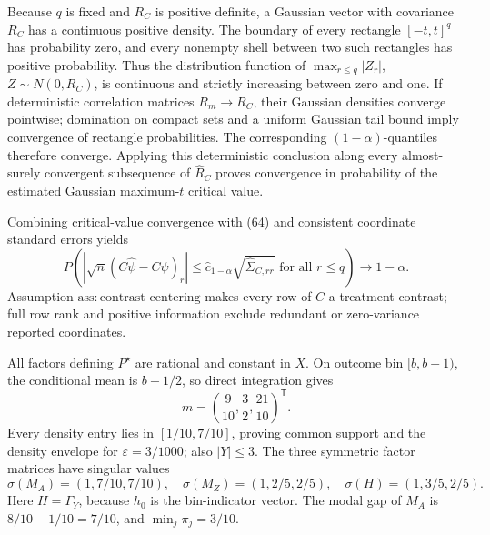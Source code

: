 Because \(q\) is fixed and \(R_C\) is positive definite, a Gaussian vector with covariance \(R_C\) has a continuous positive density.  The boundary of every rectangle \([-t,t]^q\) has probability zero, and every nonempty shell between two such rectangles has positive probability.  Thus the distribution function of \(\max_{r\leq q}|Z_r|\), \(Z\sim N(0,R_C)\), is continuous and strictly increasing between zero and one.  If deterministic correlation matrices \(R_m\to R_C\), their Gaussian densities converge pointwise; domination on compact sets and a uniform Gaussian tail bound imply convergence of rectangle probabilities.  The corresponding \((1-\alpha)\)-quantiles therefore converge.  Applying this deterministic conclusion along every almost-surely convergent subsequence of \(\widehat R_C\) proves convergence in probability of the estimated Gaussian maximum-\(t\) critical value.

Combining critical-value convergence with (64) and consistent coordinate standard errors yields
\[
 P\!\left(
 |\sqrt n(C\widehat\psi-C\psi)_r|
 \leq\widehat c_{1-\alpha}\sqrt{\widehat\Sigma_{C,rr}}
 \text{ for all }r\leq q\right)\longrightarrow1-\alpha. \tag{65}
\]
Assumption \(\mathrm{ass{:}contrast\mbox{-}centering}\) makes every row of \(C\) a treatment contrast; full row rank and positive information exclude redundant or zero-variance reported coordinates.

All factors defining \(P^\star\) are rational and constant in \(X\).  On outcome bin \([b,b+1)\), the conditional mean is \(b+1/2\), so direct integration gives
\[
 m=\left(\frac9{10},\frac32,\frac{21}{10}\right)^{\mathsf T}. \tag{66}
\]
Every density entry lies in \([1/10,7/10]\), proving common support and the density envelope for \(\varepsilon=3/1000\); also \(|Y|\leq3\).  The three symmetric factor matrices have singular values
\[
 \sigma(M_A)=(1,7/10,7/10),\quad
 \sigma(M_Z)=(1,2/5,2/5),\quad
 \sigma(H)=(1,3/5,2/5). \tag{67}
\]
Here \(H=\Gamma_Y\), because \(h_0\) is the bin-indicator vector.  The modal gap of \(M_A\) is \(8/10-1/10=7/10\), and \(\min_j\pi_j=3/10\).

